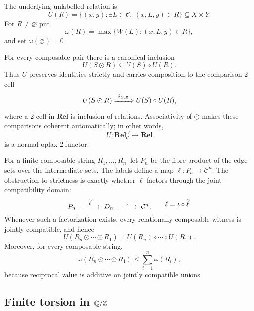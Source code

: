 The underlying unlabelled relation is
\begin{equation}\label{eq:underlying-relation}
U(R)=\{(x,y):\exists L\in\mathcal C,\ (x,L,y)\in R\}\subseteq X\times Y.
\end{equation}
For $R\ne\varnothing$ put
\[
\omega(R)=\max\{W(L):(x,L,y)\in R\},
\]
and set $\omega(\varnothing)=0$.

For every composable pair there is a canonical inclusion
\begin{equation}\label{eq:oplax-inclusion}
U(S\odot R)\subseteq U(S)\circ U(R).
\end{equation}
Thus $U$ preserves identities strictly and carries composition to the comparison $2$-cell
\begin{equation}\label{eq:oplax-2cell}
U(S\odot R)
\xRightarrow{\;\vartheta_{S,R}\;}
U(S)\circ U(R),
\end{equation}
where a $2$-cell in $\mathbf{Rel}$ is inclusion of relations.  Associativity of $\odot$ makes these comparisons coherent automatically; in other words,
\[
U:\mathbf{Rel}_{\mathcal C}^{\Omega}\longrightarrow\mathbf{Rel}
\]
is a normal oplax $2$-functor.

For a finite composable string $R_1,\ldots,R_n$, let $P_n$ be the fibre product of the edge sets over the intermediate sets.  The labels define a map $\ell:P_n\to\mathcal C^n$.  The obstruction to strictness is exactly whether $\ell$ factors through the joint-compatibility domain:
\begin{equation}\label{eq:compatibility-factorization}
\begin{CD}
P_n @>{\widetilde\ell}>> D_n @>{\iota}>> \mathcal C^n,
\end{CD}
\qquad
\ell=\iota\circ\widetilde\ell.
\end{equation}
Whenever such a factorization exists, every relationally composable witness is jointly compatible, and hence
\begin{equation}\label{eq:rel-strictification}
U(R_n\odot\cdots\odot R_1)
=
U(R_n)\circ\cdots\circ U(R_1).
\end{equation}
Moreover, for every composable string,
\begin{equation}\label{eq:mass-subadditive}
\omega(R_n\odot\cdots\odot R_1)
\le\sum_{i=1}^n\omega(R_i),
\end{equation}
because reciprocal value is additive on jointly compatible unions.

\subsection{Finite torsion in \texorpdfstring{$\mathbb Q/\mathbb Z$}{Q/Z}}


